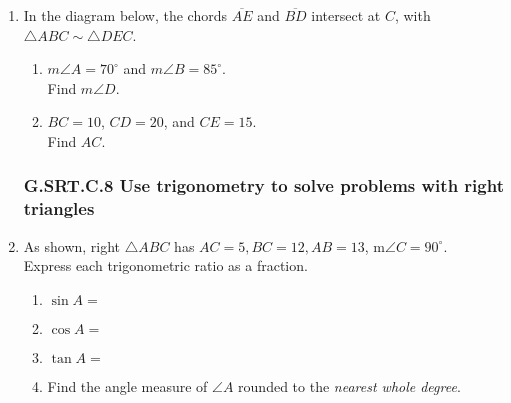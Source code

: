 \documentclass[12pt, twoside]{article}
\begin{document}
\begin{enumerate}[itemsep=0.5cm]
\item In the diagram below, the chords $\overline{AE}$ and $\overline{BD}$ intersect at $C$, with $\triangle ABC \sim \triangle DEC$.
\begin{multicols}{2}
  \begin{enumerate}

    \item $m\angle A = 70^\circ$ and $m\angle B = 85^\circ$.\\ 
    Find  $m\angle D$.
    \item $BC=10$, $CD=20$, and $CE=15$.\\ 
    Find $AC$. 
  \end{enumerate}

    \begin{center}
\end{center} \vspace{2cm}
\end{multicols} 

\newpage
\subsubsection*{G.SRT.C.8 Use trigonometry to solve problems with right triangles}
\item As shown, right $\triangle ABC$ has $AC=5, BC=12, AB=13$, m$\angle C=90^\circ$. \\[0.25cm] 
Express each trigonometric ratio as a fraction.
  \begin{multicols}{2}
    \begin{enumerate}
      \item $\sin A =$
      \item $\cos A =$
      \item $\tan A =$ 
      \item Find the angle measure of $\angle A$ rounded to the \emph{nearest whole degree}. \vspace{1cm}
    \end{enumerate}
    \begin{center}
    \end{center}
  \end{multicols}


\end{enumerate}
\end{document}
